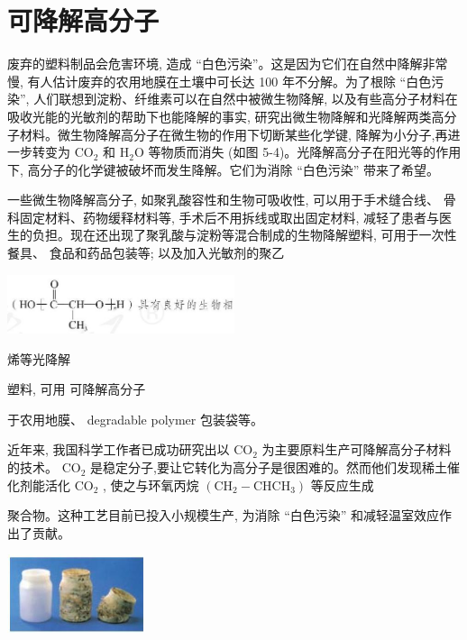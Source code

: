 \documentclass[10pt]{article}
\begin{document}
\section*{可降解高分子}

废弃的塑料制品会危害环境, 造成 “白色污染”。这是因为它们在自然中降解非常慢, 有人估计废弃的农用地膜在土壤中可长达 100 年不分解。为了根除 “白色污染”, 人们联想到淀粉、纤维素可以在自然中被微生物降解, 以及有些高分子材料在吸收光能的光敏剂的帮助下也能降解的事实, 研究出微生物降解和光降解两类高分子材料。微生物降解高分子在微生物的作用下切断某些化学键, 降解为小分子,再进一步转变为 \({\mathrm{{CO}}}_{2}\) 和 \({\mathrm{H}}_{2}\mathrm{O}\) 等物质而消失 (如图 5-4)。光降解高分子在阳光等的作用下, 高分子的化学键被破坏而发生降解。它们为消除 “白色污染” 带来了希望。

一些微生物降解高分子, 如聚乳酸容性和生物可吸收性, 可以用于手术缝合线、 骨科固定材料、药物缓释材料等, 手术后不用拆线或取出固定材料, 减轻了患者与医生的负担。现在还出现了聚乳酸与淀粉等混合制成的生物降解塑料, 可用于一次性餐具、 食品和药品包装等; 以及加入光敏剂的聚乙

\begin{center}
\includegraphics[max width=0.5\textwidth]{images/0190efc5-b58a-7c43-bfb0-e0a030df9cfd_144_937966.jpg}
\end{center}

烯等光降解

塑料, 可用 可降解高分子

于农用地膜、 degradable polymer 包装袋等。

近年来, 我国科学工作者已成功研究出以 \({\mathrm{{CO}}}_{2}\) 为主要原料生产可降解高分子材料的技术。 \({\mathrm{{CO}}}_{2}\) 是稳定分子,要让它转化为高分子是很困难的。然而他们发现稀土催化剂能活化 \({\mathrm{{CO}}}_{2}\) , 使之与环氧丙烷 \(\left( {{\mathrm{{CH}}}_{2} - {\mathrm{{CHCH}}}_{3}}\right)\) 等反应生成

聚合物。这种工艺目前已投入小规模生产, 为消除 “白色污染” 和减轻温室效应作出了贡献。

\begin{center}
\includegraphics[max width=0.3\textwidth]{images/0190efc5-b58a-7c43-bfb0-e0a030df9cfd_145_907691.jpg}
\end{center}
\end{document}
